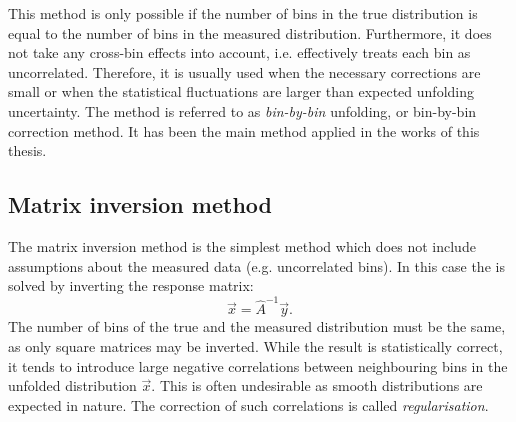 This method is only possible if the number of bins in the true distribution is equal to the number of bins in the measured distribution.
Furthermore, it does not take any cross-bin effects into account, i.e. effectively treats each bin as uncorrelated.
Therefore, it is usually used when the necessary corrections are small or when the statistical fluctuations are larger than expected unfolding uncertainty.
The method is referred to as \textit{bin-by-bin} unfolding, or bin-by-bin correction method.
It has been the main method applied in the works of this thesis.

\subsection{Matrix inversion method}
The matrix inversion method is the simplest method which does not include assumptions about the measured data (e.g. uncorrelated bins).
In this case the  is solved by inverting the response matrix:
\begin{equation}
    \vec{x} = \hat{A}^{-1}\vec{y}.
\end{equation}
The number of bins of the true and the measured distribution must be the same, as only square matrices may be inverted.
While the result is statistically correct, it tends to introduce large negative correlations between neighbouring bins in the unfolded distribution $\vec{x}$.
This is often undesirable as smooth distributions are expected in nature.
The correction of such correlations is called \textit{regularisation}.

